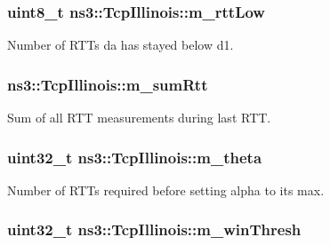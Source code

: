\subsubsection[{\texorpdfstring{m\+\_\+rtt\+Low}{m_rttLow}}]{\setlength{\rightskip}{0pt plus 5cm}uint8\+\_\+t ns3\+::\+Tcp\+Illinois\+::m\+\_\+rtt\+Low\hspace{0.3cm}{\ttfamily [private]}}\hypertarget{classns3_1_1TcpIllinois_a6acfa8c3874438bb8105779da78d2f02}{}\label{classns3_1_1TcpIllinois_a6acfa8c3874438bb8105779da78d2f02}


Number of R\+T\+Ts da has stayed below d1. 

\subsubsection[{\texorpdfstring{m\+\_\+sum\+Rtt}{m_sumRtt}}]{ ns3\+::\+Tcp\+Illinois\+::m\+\_\+sum\+Rtt\hspace{0.3cm}{\ttfamily [private]}}\hypertarget{classns3_1_1TcpIllinois_ad55319050ef5775367528ab1e2a1495d}{}\label{classns3_1_1TcpIllinois_ad55319050ef5775367528ab1e2a1495d}


Sum of all R\+TT measurements during last R\+TT. 

\subsubsection[{\texorpdfstring{m\+\_\+theta}{m_theta}}]{\setlength{\rightskip}{0pt plus 5cm}uint32\+\_\+t ns3\+::\+Tcp\+Illinois\+::m\+\_\+theta\hspace{0.3cm}{\ttfamily [private]}}\hypertarget{classns3_1_1TcpIllinois_aa612862174116f2e03372322e7f45e51}{}\label{classns3_1_1TcpIllinois_aa612862174116f2e03372322e7f45e51}


Number of R\+T\+Ts required before setting alpha to its max. 

\subsubsection[{\texorpdfstring{m\+\_\+win\+Thresh}{m_winThresh}}]{\setlength{\rightskip}{0pt plus 5cm}uint32\+\_\+t ns3\+::\+Tcp\+Illinois\+::m\+\_\+win\+Thresh\hspace{0.3cm}{\ttfamily [private]}}\hypertarget{classns3_1_1TcpIllinois_a57917764f34d9810d239423d2ad3b924}{}\label{classns3_1_1TcpIllinois_a57917764f34d9810d239423d2ad3b924}


